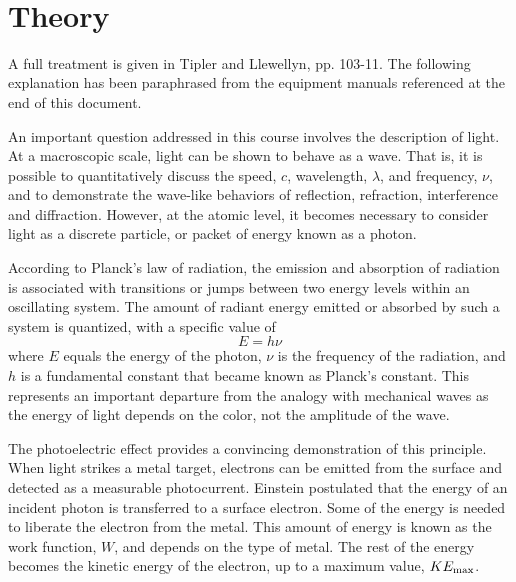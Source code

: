 \documentclass{tufte-handout}
\begin{document}



\vspace{0.5cm}
\\
\vspace{0.5cm}

\section{Theory}

A full treatment is given in Tipler and Llewellyn, pp. 103-11.  The following explanation has been paraphrased from the equipment manuals referenced at the end of this document.

An important question addressed in this course involves the description of light.   At a macroscopic scale, light can be shown to behave as a wave.  That is, it is possible to quantitatively discuss the speed, $c$, wavelength, $\lambda$, and frequency, $\nu$, and to demonstrate the wave-like behaviors of reflection, refraction, interference and diffraction.  However, at the atomic level, it becomes necessary to consider light as a discrete particle, or packet of energy known as a photon.    

According to Planck's law of radiation, the emission and absorption of radiation is associated with transitions or jumps between two energy levels within an oscillating system.   The amount of radiant energy emitted or absorbed by such a system is quantized, with a specific value of 
\begin{equation} 
E = h \nu
\end{equation}
where $E$ equals the energy of the photon, $\nu$ is the frequency of the radiation, and $h$ is a fundamental constant that became known as Planck's constant.  This represents an important departure from the analogy with mechanical waves as the energy of light depends on the color, not the amplitude of the wave.   

The photoelectric effect provides a convincing demonstration of this principle.   When light strikes a metal target, electrons can be emitted from the surface and detected as a measurable photocurrent.    Einstein postulated that the energy of an incident photon is transferred to a surface electron.  Some of the energy is needed to liberate the electron from the metal.   This amount of energy is known as the work function, $W$, and depends on the type of metal.   The rest of the energy becomes the kinetic energy of the electron, up to a maximum value, $KE_{\rm max}$.    
\end{document}
